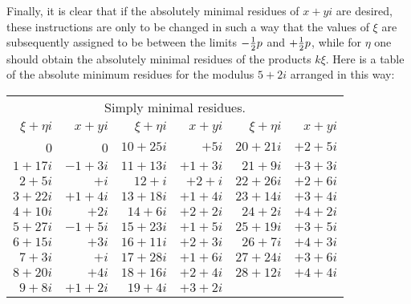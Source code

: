 \documentclass[twoside,12pt]{memoir}
\let\oldfrac\frac
\def\frac#1#2{\mathchoice{\tfrac{#1}{#2}}{\oldfrac{#1}{#2}}{\genfrac{}{}{}{2}{#1}{#2\mathstrut}}{\genfrac{}{}{}{3}{#1}{#2\mathstrut}}}
\begin{document}
Finally, it is clear that if the absolutely minimal residues of \(x+yi\) are desired, these instructions are only to be changed in such a way that the values of \(\xi\) are subsequently assigned to be between the limits \(-\frac{1}{2} p\) and \(+\frac{1}{2} p\), while for \(\eta\) one should obtain the absolutely minimal residues of the products \(k\xi\). Here is a table of the absolute minimum residues for the modulus \(5+2i\) arranged in this way:
\begin{center}
\begin{tabular}{r|r||r|r||r|r}
\multicolumn{6}{c}{Simply minimal residues.}\\
\(\xi+\eta i\) & \(x+yi\) & \(\xi+\eta i\) & \(x+yi\) & \(\xi+\eta i\) & \(x+yi\) \\
\hline
0 & 0 & \(10+25i\) & \(+5i\) & \(20+21i\) & \(+2+5i\) \\
\(1+17i\) & \(-1+3i\) & \(11+13i\) & \(+1+3i\) & \(21+9i\) & \(+3+3i\) \\
\(2+5i\) & \(+i\) & \(12+i\) & \(+2+i\) & \(22+26i\) & \(+2+6i\) \\
\(3+22i\) & \(+1+4i\) & \(13+18i\) & \(+1+4i\) & \(23+14i\) & \(+3+4i\) \\
\(4+10i\) & \(+2i\) & \(14+6i\) & \(+2+2i\) & \(24+2i\) & \(+4+2i\) \\
\(5+27i\) & \(-1+5i\) & \(15+23i\) & \(+1+5i\) & \(25+19i\) & \(+3+5i\) \\
\(6+15i\) & \(+3i\) & \(16+11i\) & \(+2+3i\) & \(26+7i\) & \(+4+3i\) \\
\(7+3i\) & \(+i\) & \(17+28i\) & \(+1+6i\) & \(27+24i\) & \(+3+6i\) \\
\(8+20i\) & \(+4i\) & \(18+16i\) & \(+2+4i\) & \(28+12i\) & \(+4+4i\) \\
\(9+8i\) & \(+1+2i\) & \(19+4i\) & \(+3+2i\) &\multicolumn{2}{c}{} \\
\end{tabular}\pagebreak%


\end{center}
\end{document}
